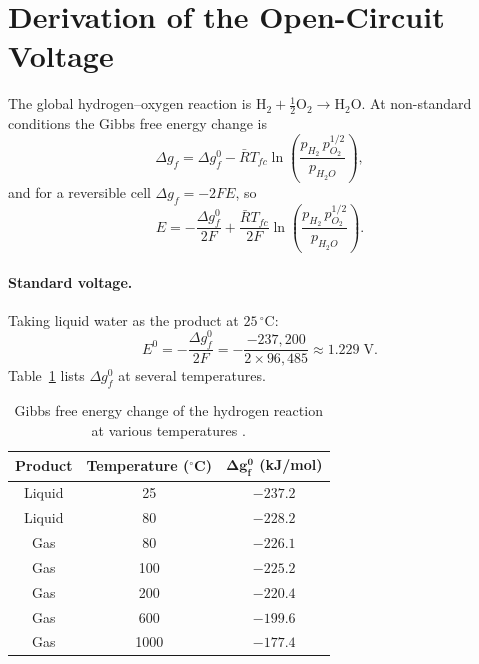 \documentclass[11pt,a4paper]{article}
\begin{document}



\appendix
{}
\newpage

\section{Derivation of the Open-Circuit Voltage}
\label{app:ocv}

The global hydrogen--oxygen reaction is
$\mathrm{H_2+\tfrac{1}{2}O_2\rightarrow H_2O}$. At non-standard conditions the
Gibbs free energy change is
\[
    \Delta g_f = \Delta g_f^0
    - \bar{R}T_{fc}\ln\!\left(\frac{p_{H_2}\,p_{O_2}^{1/2}}{p_{H_2O}}\right),
\]
and for a reversible cell $\Delta g_f=-2FE$, so
\[
    E = -\frac{\Delta g_f^0}{2F}
      + \frac{\bar{R}T_{fc}}{2F}
        \ln\!\left(\frac{p_{H_2}\,p_{O_2}^{1/2}}{p_{H_2O}}\right).
\]

\paragraph{Standard voltage.}
Taking liquid water as the product at $25\,^{\circ}$C:
\[
    E^0=-\frac{\Delta g_f^0}{2F}
       =-\frac{-237{,}200}{2\times 96{,}485}\approx 1.229\;\mathrm{V}.
\]
Table~\ref{tab:gibbs} lists $\Delta g_f^0$ at several temperatures.

\begin{table}[H]
\centering
\caption{Gibbs free energy change of the hydrogen reaction at various temperatures \cite{pukrushpan2003}.}
\label{tab:gibbs}
\begin{tabular}{ccc}
\toprule
\textbf{Product} & \textbf{Temperature ($^{\circ}$C)} & $\boldsymbol{\Delta g_f^0}$ \textbf{(kJ/mol)} \\
\midrule
Liquid & 25   & $-237.2$ \\
Liquid & 80   & $-228.2$ \\
Gas    & 80   & $-226.1$ \\
Gas    & 100  & $-225.2$ \\
Gas    & 200  & $-220.4$ \\
Gas    & 600  & $-199.6$ \\
Gas    & 1000 & $-177.4$ \\
\bottomrule
\end{tabular}
\end{table}
\end{document}
